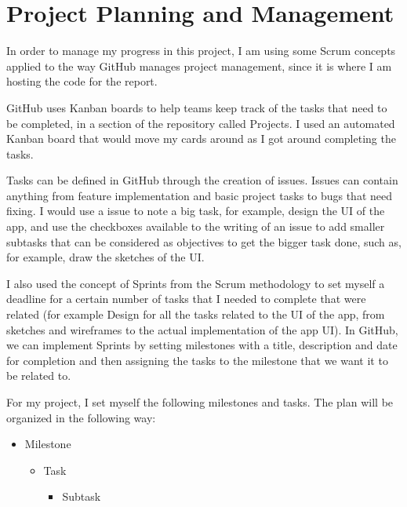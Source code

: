 \chapter{Project Planning and Management}
In order to manage my progress in this project, I am using some Scrum concepts applied to the way GitHub manages project management, since it is where I am hosting the code for the report.

GitHub uses Kanban boards to help teams keep track of the tasks that need to be completed, in a section of the repository called Projects. I used an automated Kanban board that would move my cards around as I got around completing the tasks.

Tasks can be defined in GitHub through the creation of issues. Issues can contain anything from feature implementation and basic project tasks to bugs that need fixing. I would use a issue to note a big task, for example, design the UI of the app, and use the checkboxes available to the writing of an issue to add smaller subtasks that can be considered as objectives to get the bigger task done, such as, for example, draw the sketches of the UI.

I also used the concept of Sprints from the Scrum methodology to set myself a deadline for a certain number of tasks that I needed to complete that were related (for example Design for all the tasks related to the UI of the app, from sketches and wireframes to the actual implementation of the app UI). In GitHub, we can implement Sprints by setting milestones with a title, description and date for completion and then assigning the tasks to the milestone that we want it to be related to.

For my project, I set myself the following milestones and tasks. The plan will be organized in the following way:
\begin{itemize}
  \item Milestone
  \begin{itemize}
    \item Task
    \begin{itemize}
      \item Subtask
    \end{itemize}
  \end{itemize}
\end{itemize}

